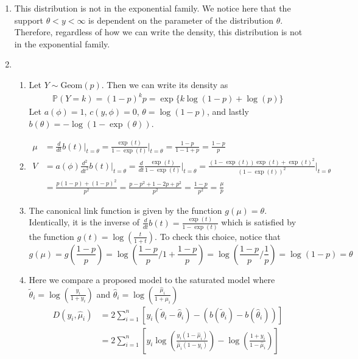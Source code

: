 \documentclass[12pt]{article}  %
\newcommand{\prob}{{\mathbb{P}}}
\begin{document}
\begin{enumerate}
\item This distribution is not in the exponential family. We notice here that the support $\theta<y<\infty$ is dependent on the parameter of the distribution $\theta$. Therefore, regardless of how we can write the density, this distribution is not in the exponential family. 

\item 
\begin{enumerate}
\item Let $Y\sim\text{Geom}(p)$. Then we can write its density as 
\begin{align*}
\prob(Y = k) = (1-p)^kp = \exp\Big\{k\log(1 - p) + \log(p)\Big\}
\end{align*}
Let $a(\phi) = 1$, $c(y,\phi) = 0$, $\theta = \log(1-p)$, and lastly $b(\theta) = -\log\left(1-\exp(\theta)\right)$. 
\item 
\begin{align*}
\mu &= \frac{d}{dt}b(t)\Big|_{t = \theta} = \frac{\exp(t)}{1-\exp(t)}\Big|_{t = \theta} = \frac{1-p}{1 - 1 + p} = \frac{1-p}{p}\\
V &= a(\phi)\frac{d^2}{dt^2}b(t)\Big|_{t = \theta} = \frac{d}{dt}\frac{\exp(t)}{1-\exp(t)}\Big|_{t = \theta} = \frac{(1-\exp(t))\exp(t) + \exp(t)^2}{(1-\exp(t))^2}\Big|_{t = \theta}\\
&= \frac{p(1-p) + (1-p)^2}{p^2} = \frac{p -p^2 + 1 -2p +p^2}{p^2} = \frac{1 - p}{p^2} = \frac{\mu}{p}
\end{align*}
\item The canonical link function is given by the function $g(\mu) = \theta$. Identically, it is the inverse of $\frac{d}{dt}b(t) = \frac{\exp(t)}{1-\exp(t)}$ which is satisfied by the function $g(t) = \log\left(\frac{t}{1+t}\right)$. To check this choice, notice that $$g(\mu) = g\left(\frac{1-p}{p}\right) = \log\left(\frac{1-p}{p}/1 + \frac{1-p}{p}\right) = \log\left(\frac{1-p}{p}/\frac{1}{p}\right) = \log(1-p) = \theta$$
\item Here we compare a proposed model to the saturated model where $\tilde{\theta}_i = \log\left(\frac{y_i}{1+y_i}\right)$ and $\hat{\theta}_i = \log\left(\frac{\hat{\mu}_i}{1 + \hat{\mu}_i}\right)$
\begin{align*}
D(y_i, \hat{\mu}_i) &= 2\sum_{i=1}^n \left[y_i(\tilde{\theta}_i - \hat{\theta}_i) - (b(\tilde{\theta}_i)-b(\hat{\theta}_i))\right]\\
&= 2\sum_{i=1}^n \left[y_i\log\left(\frac{y_i(1-\hat{\mu}_i)}{\hat{\mu}_i(1-y_i)}\right) - \log\left(\frac{1+y_i}{1-\hat{\mu}_i}\right)\right]\\
\end{align*}
\end{enumerate}


\end{enumerate}
\end{document}

